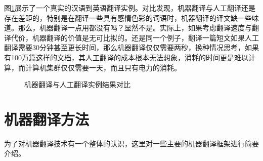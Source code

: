 \parinterval 图\ref{fig:1-9}展示了一个真实的汉语到英语翻译实例。对比发现，机器翻译与人工翻译还是存在差距的，特别是在翻译一些具有感情色彩的词语时，机器翻译的译文缺一些味道。那么，机器翻译一点用都没有吗？显然不是。实际上，如果考虑翻译速度与翻译代价，机器翻译的价值是无可比拟的。还是同一个例子，翻译一篇短文如果人工翻译需要30分钟甚至更长时间，那么机器翻译仅仅需要两秒，换种情况思考，如果有100万篇这样的文档，其人工翻译的成本根本无法想象，消耗的时间更是难以计算，而计算机集群仅仅需要一天，而且只有电力的消耗。

\begin{figure}[htp]
    \centering

\end{figure}
\begin{figure}[t]
    \centering

    \caption{机器翻译与人工翻译实例结果对比}
\setlength{\belowcaptionskip}{7.0em}
    \label{fig:1-9}
\end{figure}


\sectionnewpage
\section{机器翻译方法}
\parinterval 为了对机器翻译技术有一个整体的认识，这里对一些主要的机器翻译框架进行简要介绍。

